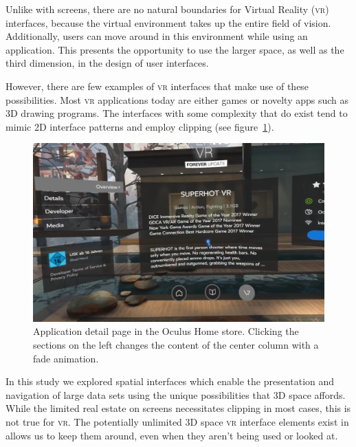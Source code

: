 \documentclass[nobib]{tufte-book} %
\begin{document}
Unlike with screens, there are no natural boundaries for Virtual Reality (\textsc{vr}) interfaces, because the virtual environment takes up the entire field of vision. Additionally, users can move around in this environment while using an application. This presents the opportunity to use the larger space, as well as the third dimension, in the design of user interfaces.

However, there are few examples of \textsc{vr} interfaces that make use of these possibilities. Most \textsc{vr} applications today are either games or novelty apps such as 3D drawing programs.
The interfaces with some complexity that do exist tend to mimic 2D interface patterns and employ clipping (see figure~\ref{fig:superhot}).

\begin{figure}
  \includegraphics{superhot.png}
  \caption{Application detail page in the Oculus Home store. Clicking the sections on the left changes the content of the center column with a fade animation.}
  \label{fig:superhot}
\end{figure}

In this study we explored spatial interfaces which enable the presentation and navigation of large data sets using the unique possibilities that 3D space affords. While the limited real estate on screens necessitates clipping in most cases, this is not true for \textsc{vr}. The potentially unlimited 3D space \textsc{vr} interface elements exist in allows us to keep them around, even when they aren't being used or looked at.

\end{document}
